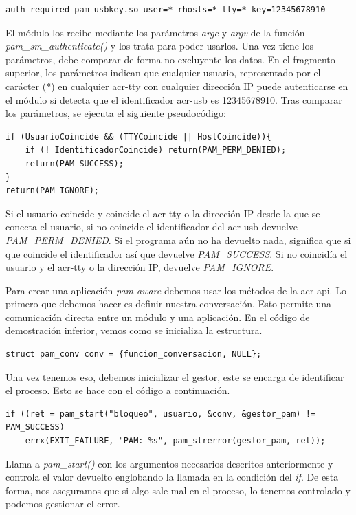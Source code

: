 \documentclass[titlepage, 12pt, a4paper]{article}
\begin{document}
{\begin{lstlisting}
auth required pam_usbkey.so user=* rhosts=* tty=* key=12345678910
\end{lstlisting}
El módulo los recibe mediante los parámetros \textit{argc} y \textit{argv} de la función \textit{pam\_sm\_authenticate()} y los trata para poder usarlos. Una vez tiene los parámetros, debe comparar de forma no excluyente los datos. En el fragmento superior, los parámetros indican que cualquier usuario, representado por el carácter (*) en cualquier \gls{acr-tty} con cualquier dirección IP puede autenticarse en el módulo si detecta que el identificador \gls{acr-usb} es 12345678910. Tras comparar los parámetros, se ejecuta el siguiente pseudocódigo:
\begin{lstlisting}[xleftmargin=.07\textwidth]
if (UsuarioCoincide && (TTYCoincide || HostCoincide)){
	if (! IdentificadorCoincide) return(PAM_PERM_DENIED);
	return(PAM_SUCCESS);
}
return(PAM_IGNORE);
\end{lstlisting}
Si el usuario coincide y coincide el \gls{acr-tty} o la dirección IP desde la que se conecta el usuario, si no coincide el identificador del \gls{acr-usb} devuelve \textit{PAM\_PERM\_DENIED}. Si el programa aún no ha devuelto nada, significa que si que coincide el identificador así que devuelve \textit{PAM\_SUCCESS}. Si no coincidía el usuario y el \gls{acr-tty} o la dirección IP, devuelve \textit{PAM\_IGNORE}.\par
Para crear una aplicación \textit{pam-aware} debemos usar los métodos de la \gls{acr-api}. Lo primero que debemos hacer es definir nuestra conversación. Esto permite una comunicación directa entre un módulo y una aplicación. En el código de demostración inferior, vemos como se inicializa la estructura.
\begin{lstlisting}[xleftmargin=.1\textwidth]
struct pam_conv conv = {funcion_conversacion, NULL};
\end{lstlisting}
Una vez tenemos eso, debemos inicializar el gestor, este se encarga de identificar el proceso. Esto se hace con el código a continuación.
\begin{lstlisting}[xleftmargin=0\textwidth]
if ((ret = pam_start("bloqueo", usuario, &conv, &gestor_pam) != PAM_SUCCESS)
	errx(EXIT_FAILURE, "PAM: %s", pam_strerror(gestor_pam, ret));
\end{lstlisting}
Llama a \textit{pam\_start()} con los argumentos necesarios descritos anteriormente y controla el valor devuelto englobando la llamada en la condición del \textit{if}. De esta forma, nos aseguramos que si algo sale mal en el proceso, lo tenemos controlado y podemos gestionar el error.\par
}
\end{document}
